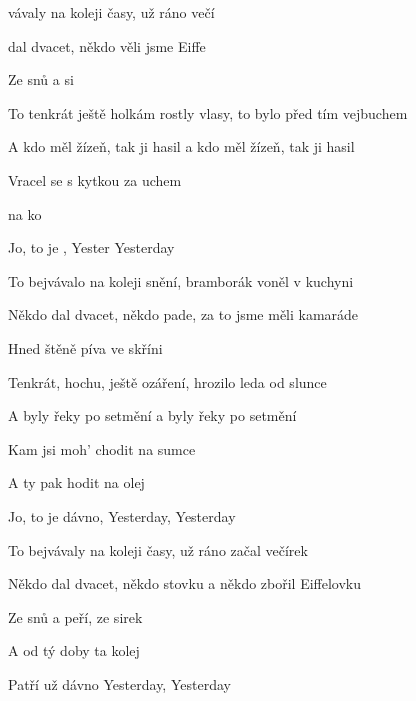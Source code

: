 

\zs
{}vávaly na koleji časy,
už ráno  večí

 dal dvacet, někdo 
věli jsme Eiffe

Ze snů a   si
\ks

\zs
To tenkrát ještě holkám rostly vlasy,
to bylo před tím vejbuchem

A kdo měl žízeň, tak ji hasil
a kdo měl žízeň, tak ji hasil

Vracel se s kytkou za uchem
\ks

\zr
{}  na ko

Jo, to je , Yester Yesterday   
\kr

\zs
To bejvávalo na koleji snění,
bramborák voněl v kuchyni

Někdo dal dvacet, někdo pade,
za to jsme měli kamaráde

Hned štěně píva ve skříni
\ks

\zs
Tenkrát, hochu, ještě ozáření,
hrozilo leda od slunce

A byly řeky po setmění
a byly řeky po setmění

Kam jsi moh' chodit na sumce
\ks

\zr
A ty pak hodit na olej

Jo, to je dávno, Yesterday, Yesterday
\kr

\zs
To bejvávaly na koleji časy,
už ráno začal večírek

Někdo dal dvacet, někdo stovku
a někdo zbořil Eiffelovku

Ze snů a peří, ze sirek
\ks

\zr
A od tý doby ta kolej

Patří už dávno Yesterday, Yesterday
\kr

\kp




















